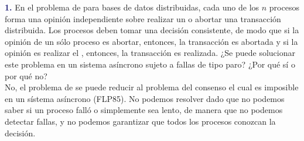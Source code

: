\newpage\textbf{\textcolor{MidnightBlue}{1.}}
En el problema de  para bases de datos distribuidas, cada uno de los $n$ procesos forma una opinión independiente sobre realizar un  o abortar una transacción distribuida. Los procesos deben tomar una decisión consistente, de modo que si la opinión de un sólo proceso es abortar, entonces, la transacción es abortada y si la opinión es realizar el , entonces, la transacción es realizada. ¿Se puede solucionar este problema en un sistema asíncrono sujeto a fallas de tipo paro? ¿Por qué sí o por qué no?\\

No, el problema de  se puede reducir al problema del consenso el cual es imposible en un sístema asíncrono (FLP85). No podemos resolver  dado que no podemos saber si un proceso falló o simplemente sea lento, de manera que no podemos detectar fallas, y no podemos garantizar que todos los procesos conozcan la decisión.
